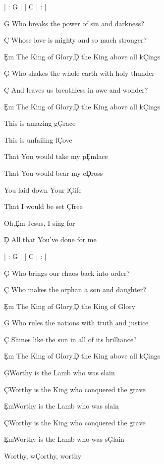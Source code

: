 \documentclass[9pt]{extarticle}
\begin{document}
\bsong

\bi
| : G |  | C | : |
\ei

\bv
\c{G} Who breaks the power of sin and darkness?

\c{C} Whose love is mighty and so much stronger?

\c{Em} The King of Glory,\c{D} the King above all k\c{C}ings
\ev

\bv
\c{G} Who shakes the whole earth with holy thunder

\c{C} And leaves us breathless in awe and wonder?

\c{Em} The King of Glory,\c{D} the King above all k\c{C}ings
\ev

\bc
This is amazing g\c{G}race

This is unfailing l\c{C}ove

That You would take my p\c{Em}lace

That You would bear my c\c{D}ross



You laid down Your l\c{G}ife

That I would be set \c{C}free

Oh,\c{Em} Jesus, I sing for

\c{D} All that You've done for me
\ec

\bin
| : G |  | C | : |
\ein

\bv
\c{G} Who brings our chaos back into order?

\c{C} Who makes the orphan a son and daughter?

\c{Em} The King of Glory,\c{D} the King of Glory
\ev

\bv
\c{G} Who rules the nations with truth and justice

\c{C} Shines like the sun in all of its brilliance?

\c{Em} The King of Glory,\c{D} the King above all k\c{C}ings
\ev


\bb
\c{G}Worthy is the Lamb who was slain

\c{C}Worthy is the King who conquered the grave
\eb

\bb
\c{Em}Worthy is the Lamb who was slain

\c{C}Worthy is the King who conquered the grave
\eb


\bb
\c{Em}Worthy is the Lamb who was s\c{G}lain

Worthy, w\c{C}orthy, worthy
\eb


\esong
\end{document}
